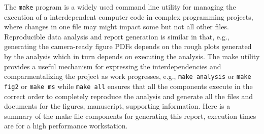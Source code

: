 \documentclass[helv,10pt,man,floatsintext]{apa6}  %
\begin{document}
The \texttt{make} program is a widely used command line
utility for managing the execution of a interdependent computer code
in complex programming projects, where changes in one file may might
impact some but not all other files. Reproducible data analysis and
report generation is similar in that, e.g., generating the
camera-ready figure PDFs depends on the rough plots generated by the
analysis which in turn depends on executing the analysis. The make
utility provides a useful mechanism for expressing the
interdependencies and comparmentalizing the project as work
progresses, e.g., \texttt{make analysis} or
\texttt{make fig2} or \texttt{make ms} while
\texttt{make all} ensures that all the components execute in
the correct order to completely reproduce the analysis and generate
all the files and documents for the figures, manuscript, supporting
information. Here is a summary of the make file components for
generating this report, execution times are for a high performance
workstation.
\end{document}

